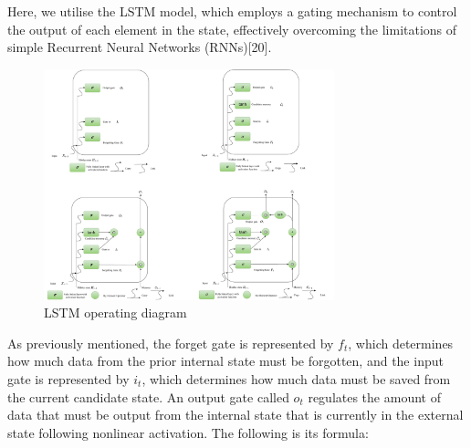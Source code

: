\documentclass[12pt]{article}  %
\begin{document}
Here, we utilise the LSTM model, which employs a gating mechanism to control the output of each element in the state, effectively overcoming the limitations of simple Recurrent Neural Networks (RNNs)[20].


\begin{figure}[htbp]
    \centering
    \includegraphics[width=0.75\textwidth]{picture/lstm.pdf} 	%
    \caption{LSTM operating diagram}		%
    \label{fig:5655}							%
\end{figure}
\FloatBarrier

As previously mentioned, the forget gate is represented by \(f_t\), which determines how much data from the prior internal state must be forgotten, and the input gate is represented by \(i_t\), which determines how much data must be saved from the current candidate state. An output gate called \(o_t\) regulates the amount of data that must be output from the internal state that is currently in the external state following nonlinear activation. The following is its formula:
\end{document}
